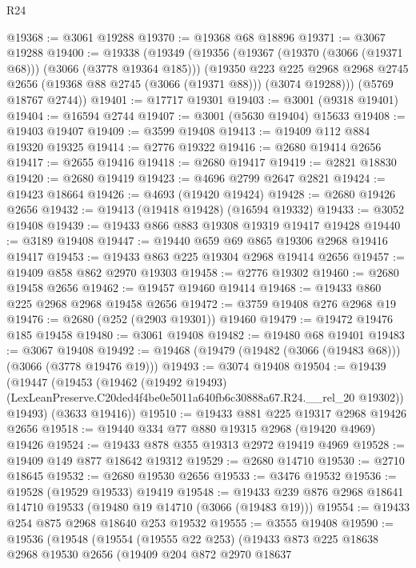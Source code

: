 \begin{lexlean}{R24}
\begin{coremodule}
@19368 := @3061 @19288
@19370 := @19368 @68 @18896
@19371 := @3067 @19288
@19400 := @19338
    (@19349
      (@19356
        (@19367 (@19370 (@3066 (@19371 @68))) (@3066 (@3778 @19364 @185)))
        (@19350
          @223
          @225
          @2968
          @2968
          @2745
          @2656
          (@19368 @88 @2745 (@3066 (@19371 @88)))
          (@3074 @19288)))
      (@5769 @18767 @2744))
@19401 := @17717 @19301
@19403 := @3001 (@9318 @19401)
@19404 := @16594 @2744
@19407 := @3001 (@5630 @19404) @15633
@19408 := @19403 @19407
@19409 := @3599 @19408
@19413 := @19409 @112 @884 @19320 @19325
@19414 := @2776 @19322
@19416 := @2680 @19414 @2656
@19417 := @2655 @19416
@19418 := @2680 @19417
@19419 := @2821 @18830
@19420 := @2680 @19419
@19423 := @4696 @2799 @2647 @2821
@19424 := @19423 @18664
@19426 := @4693 (@19420 @19424)
@19428 := @2680 @19426 @2656
@19432 := @19413 (@19418 @19428) (@16594 @19332)
@19433 := @3052 @19408
@19439 := @19433 @866 @883 @19308 @19319 @19417 @19428
@19440 := @3189 @19408
@19447 := @19440 @659 @69 @865 @19306 @2968 @19416 @19417
@19453 := @19433 @863 @225 @19304 @2968 @19414 @2656
@19457 := @19409 @858 @862 @2970 @19303
@19458 := @2776 @19302
@19460 := @2680 @19458 @2656
@19462 := @19457 @19460 @19414
@19468 := @19433 @860 @225 @2968 @2968 @19458 @2656
@19472 := @3759 @19408 @276 @2968 @19
@19476 := @2680 (@252 (@2903 @19301)) @19460
@19479 := @19472 @19476 @185 @19458
@19480 := @3061 @19408
@19482 := @19480 @68 @19401
@19483 := @3067 @19408
@19492 := @19468 (@19479 (@19482 (@3066 (@19483 @68))) (@3066 (@3778 @19476 @19)))
@19493 := @3074 @19408
@19504 := @19439
    (@19447
      (@19453
        (@19462
          (@19492 @19493)
          (LexLeanPreserve.C20ded4f4be0e5011a640fb6c30888a67.R24.__rel_20 @19302))
        @19493)
      (@3633 @19416))
@19510 := @19433 @881 @225 @19317 @2968 @19426 @2656
@19518 := @19440 @334 @77 @880 @19315 @2968 (@19420 @4969) @19426
@19524 := @19433 @878 @355 @19313 @2972 @19419 @4969
@19528 := @19409 @149 @877 @18642 @19312
@19529 := @2680 @14710
@19530 := @2710 @18645
@19532 := @2680 @19530 @2656
@19533 := @3476 @19532
@19536 := @19528 (@19529 @19533) @19419
@19548 := @19433 @239 @876 @2968 @18641 @14710 @19533 (@19480 @19 @14710 (@3066 (@19483 @19)))
@19554 := @19433 @254 @875 @2968 @18640 @253 @19532
@19555 := @3555 @19408
@19590 := @19536
    (@19548
      (@19554
        (@19555 @22 @253)
        (@19433
          @873
          @225
          @18638
          @2968
          @19530
          @2656
          (@19409
            @204
            @872
            @2970
            @18637

\end{coremodule}
\end{lexlean}
